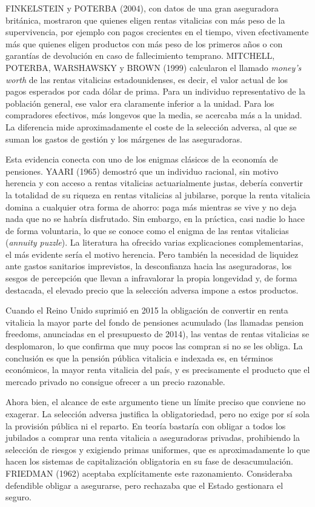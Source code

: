 \documentclass[10pt,a4paper]{article}
\begin{document}
FINKELSTEIN y POTERBA (2004), con datos de una gran aseguradora británica, mostraron que quienes eligen rentas vitalicias con más peso de la supervivencia, por ejemplo con pagos crecientes en el tiempo, viven efectivamente más que quienes eligen productos con más peso de los primeros años o con garantías de devolución en caso de fallecimiento temprano. MITCHELL, POTERBA, WARSHAWSKY y BROWN (1999) calcularon el llamado \textit{money's worth} de las rentas vitalicias estadounidenses, es decir, el valor actual de los pagos esperados por cada dólar de prima. Para un individuo representativo de la población general, ese valor era claramente inferior a la unidad. Para los compradores efectivos, más longevos que la media, se acercaba más a la unidad. La diferencia mide aproximadamente el coste de la selección adversa, al que se suman los gastos de gestión y los márgenes de las aseguradoras.

Esta evidencia conecta con uno de los enigmas clásicos de la economía de pensiones. YAARI (1965) demostró que un individuo racional, sin motivo herencia y con acceso a rentas vitalicias actuarialmente justas, debería convertir la totalidad de su riqueza en rentas vitalicias al jubilarse, porque la renta vitalicia domina a cualquier otra forma de ahorro: paga más mientras se vive y no deja nada que no se habría disfrutado. Sin embargo, en la práctica, casi nadie lo hace de forma voluntaria, lo que se conoce como el enigma de las rentas vitalicias (\textit{annuity puzzle}). La literatura ha ofrecido varias explicaciones complementarias, el más evidente sería el motivo herencia. Pero también la necesidad de liquidez ante gastos sanitarios imprevistos, la desconfianza hacia las aseguradoras, los sesgos de percepción que llevan a infravalorar la propia longevidad y, de forma destacada, el elevado precio que la selección adversa impone a estos productos.

Cuando el Reino Unido suprimió en 2015 la obligación de convertir en renta vitalicia la mayor parte del fondo de pensiones acumulado (las llamadas pension freedoms, anunciadas en el presupuesto de 2014), las ventas de rentas vitalicias se desplomaron, lo que confirma que muy pocos las compran si no se les obliga. La conclusión es que la pensión pública vitalicia e indexada es, en términos económicos, la mayor renta vitalicia del país, y es precisamente el producto que el mercado privado no consigue ofrecer a un precio razonable.

Ahora bien, el alcance de este argumento tiene un límite preciso que conviene no exagerar. La selección adversa justifica la obligatoriedad, pero no exige por sí sola la provisión pública ni el reparto. En teoría bastaría con obligar a todos los jubilados a comprar una renta vitalicia a aseguradoras privadas, prohibiendo la selección de riesgos y exigiendo primas uniformes, que es aproximadamente lo que hacen los sistemas de capitalización obligatoria en su fase de desacumulación. FRIEDMAN (1962) aceptaba explícitamente este razonamiento. Consideraba defendible obligar a asegurarse, pero rechazaba que el Estado gestionara el seguro. 
\end{document}
